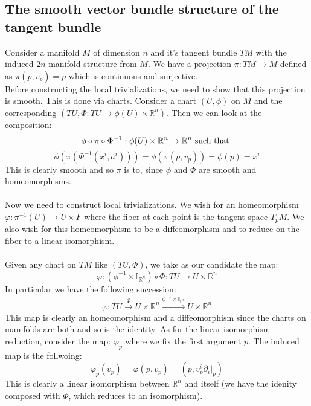 \documentclass[12pt,a4paper]{report}
\theoremstyle{definition}
\theoremstyle{Theorem}
\theoremstyle{definition}
\theoremstyle{definition}
\theoremstyle{definition}
\begin{document}
		\subsection{The smooth vector bundle structure of the tangent bundle}
		Consider a manifold $M$ of dimension $n$ and it's tangent bundle $TM$ with the induced $2n$-manifold structure from $M$. We have a projection $\pi:TM\rightarrow M$ defined as $\pi(p,v_p)=p$ which is continuous and surjective. 
		\\
		Before constructing the local trivializations, we need to show that this projection is smooth. This is done via charts. Consider a chart $(U,\phi)$ on $M$ and the corresponding $(TU,\Phi:TU\rightarrow \phi(U)\times \mathbb{R}^n)$. Then we can look at the composition:
		$$\phi\circ \pi\circ \Phi^{-1}:\phi(U)\times \mathbb{R}^n\rightarrow \mathbb{R}^n \hbox{ such that }$$ 
		$$\phi(\pi(\Phi^{-1}(x^i,a^i)))=\phi(\pi(p,v_p))=\phi(p)=x^i$$
		This is clearly smooth and so $\pi$ is to, since $\phi$ and $\Phi$ are smooth and homeomorphisms.\\
		\\
		Now we need to construct local trivializations. We wish for an homeomorphism $\varphi:\pi^{-1}(U)\rightarrow U\times F$ where the fiber at each point is the tangent space $T_pM$. We also wish for this homeomorphism to be a diffeomorphism and to reduce on the fiber to a linear isomorphism.\\
		\\
		Given any chart on $TM$ like $(TU,\Phi)$, we take as our candidate the map: 
		$$\varphi:(\phi^{-1}\times \mathbb{I}_{\mathbb{R}^n})\circ \Phi:TU\rightarrow U\times \mathbb{R}^n$$
		In particular we have the following succession:
		$$\varphi:TU\xrightarrow{\text{$\Phi$}} U\times \mathbb{R}^n\xrightarrow{\text{$\phi^{-1}\times \mathbb{I}_{\mathbb{R}^n}$}}U\times \mathbb{R}^n$$
		This map is clearly an homeomorphism and a diffeomorphism since the charts on manifolds are both and so is the identity. As for the linear isomorphism reduction, consider the map:
		$\varphi_p$ where we fix the first argument $p$. The induced map is the follwoing:
		$$\varphi_p(v_p)=\varphi(p,v_p)=(p,v^i_p\partial_i|_p)$$
		This is clearly a linear isomorphism between $\mathbb{R}^n$ and itself (we have the idenity composed with $\Phi$, which reduces to an isomorphism).
\end{document}
